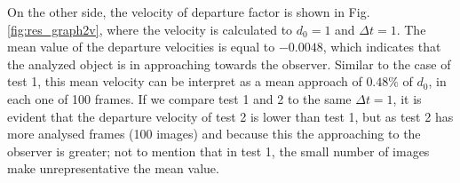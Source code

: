 On the other side, the velocity of departure factor is shown in 
Fig. \ref{fig:res_graph2v}, where the velocity is calculated
to $d_0=1$ and $\Delta t=1$. The mean value of the departure
velocities is equal to $-0.0048$, which indicates that the
analyzed object is in approaching towards the observer. Similar
to the case of test 1, this mean velocity can be interpret
as a mean approach of $0.48\%$ of $d_0$, in each one of 100 frames.
If we compare test 1 and 2 to the same $\Delta t=1$, it is evident 
that the departure velocity of  test 2  is lower than  test 1, 
but as  test 2 has more analysed frames (100 images)
and because this the approaching to the observer is greater; 
not to mention that in test 1, the small number of images 
make  unrepresentative the mean value.




